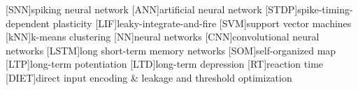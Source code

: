 \begin{acronym}[XXXX]
    [SNN]{spiking neural network}
    [ANN]{artificial neural network}
    [STDP]{spike-timing-dependent plasticity}
    [LIF]{leaky-integrate-and-fire}
    [SVM]{support vector machines}
    [kNN]{k-means clustering}
    [NN]{neural networks}
    [CNN]{convolutional neural networks}
    [LSTM]{long short-term memory networks}
    [SOM]{self-organized map}
    [LTP]{long-term potentiation}
    [LTD]{long-term depression}
    [RT]{reaction time}
    [DIET]{direct input encoding & leakage and threshold optimization}
\end{acronym}